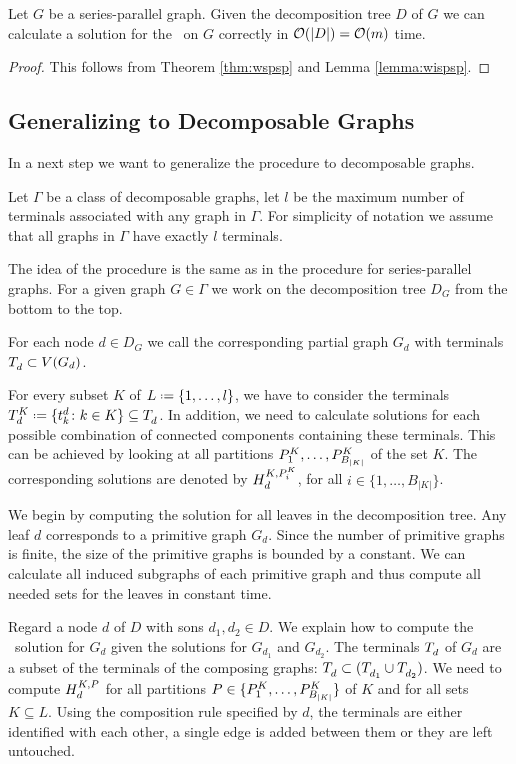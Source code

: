 \begin{corollary}
	\label{cor:wispsp}
	Let $G$ be a series-parallel graph. Given the decomposition tree $D$ of $G$ we can calculate a solution for the \WISP\ on $G$ correctly in $\mathcal{O}(|D|) = \mathcal{O}(m)$ time.
\end{corollary}
\begin{proof}
	This follows from Theorem \ref{thm:wspsp} and Lemma \ref{lemma:wispsp}.
\end{proof}


\subsection{Generalizing to Decomposable Graphs}
\label{sec:dynamicprog:decomposable}

In a next step we want to generalize the procedure to decomposable graphs.\medskip

Let $\Gamma$ be a class of decomposable graphs, let $l$ be the maximum number of terminals associated with any graph in $\Gamma$. For simplicity of notation we assume that all graphs in $\Gamma$ have exactly $l$ terminals.\medskip

The idea of the procedure is the same as in the procedure for series-parallel graphs. For a given graph $G \in \Gamma$ we work on the decomposition tree $D_G$ from the bottom to the top.\medskip

For each node $d \in D_G$ we call the corresponding partial graph $G_d$ with terminals $T_{d}^{} \subset V(G_d)$.\medskip

For every subset $K$ of $L \defeq \{1,\ldots, l\}$, we have to consider the terminals $\WSPT{d}{K} \defeq \{\WSPt{k}{d} \colon k \in K \} \subseteq \WSPT{d}{}$. In addition, we need to calculate solutions for each possible combination of connected components containing these terminals. This can be achieved by looking at all partitions $P_{1}^{K},\ldots,P_{B_{|K|}}^{K}$ of the set $K$. The corresponding solutions are denoted by $H_{d}^{K,P^K_i}$, for all $i\in \{1,\ldots,B_{|K|}\}$.\medskip

We begin by computing the solution for all leaves in the decomposition tree. Any leaf $d$ corresponds to a primitive graph $G_d$. Since the number of primitive graphs is finite, the size of the primitive graphs is bounded by a constant. We can calculate all induced subgraphs of each primitive graph and thus compute all needed sets for the leaves in constant time.\medskip

Regard a node $d$ of $D$ with sons $d_1, d_2\in D$. We explain how to compute the \maxWSP\ solution for $G_d$ given the solutions for $G_{d_1}$ and $G_{d_2}$. The terminals $T_{d}^{}$ of $G_d$ are a subset of the terminals of the composing graphs: $T_{d}^{} \subset (T_{d_1}^{} \cup T_{d_2}^{})$. We need to compute $H_{d}^{K,P}$ for all partitions $P \in \{P_{1}^{K},\ldots,P_{B_{|K|}}^{K}\}$ of $K$ and for all sets $K \subseteq L$. Using the composition rule specified by $d$, the terminals are either identified with each other, a single edge is added between them or they are left untouched.\medskip

